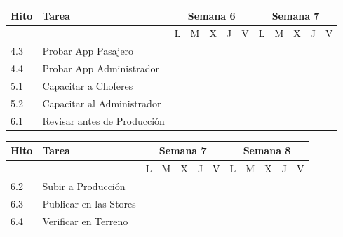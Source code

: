 \documentclass[12pt]{article}
\begin{document}
\begin{table}[!h]
\centering
\begin{tabular}{|p{1.5cm}|p{7cm}|*{10}{c|}}
\hline
\textbf{Hito} & \textbf{Tarea} & \multicolumn{5}{c|}{\textbf{Semana 6}} & \multicolumn{5}{c|}{\textbf{Semana 7}} \\
\hline
 & & L & M & X & J & V & L & M & X & J & V \\
\hline
4.3 & Probar App Pasajero & \cellcolor{gray} & \cellcolor{gray} & & & & & & & & \\
\hline
4.4 & Probar App Administrador & & \cellcolor{gray} & \cellcolor{gray} & & & & & & & \\
\hline
5.1 & Capacitar a Choferes & & & & & & & \cellcolor{gray} & \cellcolor{gray} & & \\
\hline
5.2 & Capacitar al Administrador & & & & & & & & \cellcolor{gray} & \cellcolor{gray} & \\
\hline
6.1 & Revisar antes de Producción & & & & & & \cellcolor{gray} & & & & \\
\hline
\end{tabular}
\end{table}

\begin{table}[!h]
\centering
\begin{tabular}{|p{1.5cm}|p{7cm}|*{10}{c|}}
\hline
\textbf{Hito} & \textbf{Tarea} & \multicolumn{5}{c|}{\textbf{Semana 7}} & \multicolumn{5}{c|}{\textbf{Semana 8}} \\
\hline
 & & L & M & X & J & V & L & M & X & J & V \\
\hline
6.2 & Subir a Producción & & \cellcolor{gray} & \cellcolor{gray} & & & & & & & \\
\hline
6.3 & Publicar en las Stores & & & & & & \cellcolor{gray} & & & & \\
\hline
6.4 & Verificar en Terreno & & & & & & & \cellcolor{gray} & \cellcolor{gray} & & \\
\hline
\end{tabular}
\end{table}

\newpage
\end{document}
